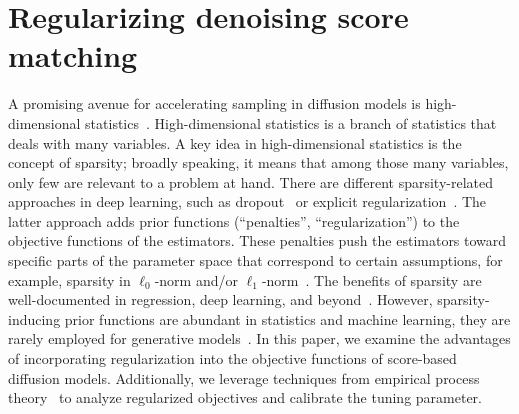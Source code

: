\section{Regularizing denoising score matching}\label{Sec:main}
A promising avenue for accelerating sampling in diffusion models is high-dimensional statistics~\citep{Lederer2021HD}.  
High-dimensional statistics is a branch of statistics that deals with many variables.
A key idea in high-dimensional statistics is the concept of sparsity;
broadly speaking,
it means that among those many variables, only few are relevant to a problem at hand.
There are different sparsity-related approaches in deep learning,
such as dropout~\citep{Hinton2012,Molchanov2017,labach2019survey,gomez2019learning} or explicit regularization~\citep{Alvarez16,Feng17}. 
The latter approach adds prior functions (``penalties'', ``regularization'') to the objective functions of the estimators.
These penalties push the estimators toward specific parts of the parameter space that correspond to certain assumptions, for example, sparsity in $\ell_0$-norm and/or $\ell_1$-norm~\citep{Lederer2021HD}. 
The benefits of sparsity are well-documented in regression, deep learning, and beyond~\citep{Eldar:2012,Hastie2015,Neyshabur2015,Golowich17,Hieber2017,HEBIRI2025106195,golestaneh2024many}.
However, sparsity-inducing prior functions are abundant in statistics and machine learning, 
they are rarely employed for generative models~\citep{lin2016estimation}. 
In this paper, we examine the advantages of incorporating regularization into the objective functions of score-based diffusion models.
Additionally, we leverage techniques from empirical process theory~\cite{Sara2000,Vershynin2018} to analyze regularized objectives and calibrate the tuning parameter.

